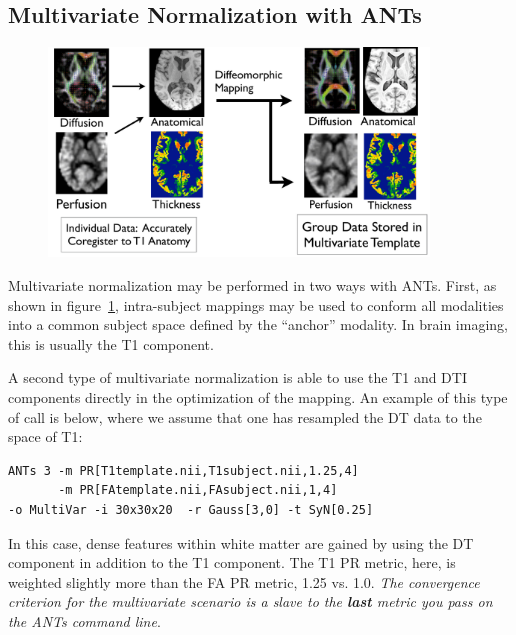 \documentclass{InsightArticle}
\begin{document}
\subsection{Multivariate Normalization with ANTs}
\begin{figure}
\includegraphics[width=0.9\textwidth]{Figures/multivariatenorm.pdf} 
\vspace{-0.1in}
\label{fig:mvnorm}
\end{figure}
Multivariate normalization may be performed in two ways with ANTs.  
First, as shown in figure~\ref{fig:mvnorm}, intra-subject mappings may 
be used to conform all modalities into a common subject space defined by 
the ``anchor'' modality.  In brain imaging, this is usually the T1 component.  

A second type of multivariate normalization is able to use the T1 and DTI components 
directly in the optimization of the mapping.  An example of this type of call is below, 
where we assume that one has resampled the DT data to the space of T1: 
\begin{verbatim}
ANTs 3 -m PR[T1template.nii,T1subject.nii,1.25,4]
       -m PR[FAtemplate.nii,FAsubject.nii,1,4] 
-o MultiVar -i 30x30x20  -r Gauss[3,0] -t SyN[0.25]
\end{verbatim}
In this case, dense features within white matter are gained by using the DT component  
in addition to the T1 component.   The T1 PR metric, here, is weighted slightly more 
than the FA PR metric, 1.25 vs. 1.0.  {\em The convergence criterion for 
the multivariate scenario is a slave to the {\bf last} metric you 
pass on the ANTs command line}.
\end{document}
